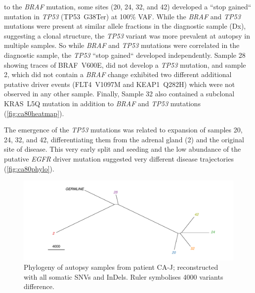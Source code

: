  to the \textit{BRAF} mutation, some sites (20, 24, 32, and 42) developed a ``stop gained`` mutation in \textit{TP53} (TP53~G38Ter) at 100\% VAF. While  the \textit{BRAF} and \textit{TP53} mutations were present at similar allele fractions in the diagnostic sample (Dx), suggesting a clonal structure, the \textit{TP53} variant was more prevalent at autopsy in multiple samples. So while \textit{BRAF} and \textit{TP53} mutations were correlated in the diagnostic sample, the \textit{TP53} ``stop gained`` developed independently.
Sample 28  showing traces of BRAF~V600E, did not develop a \textit{TP53} mutation, and sample 2, which did not contain a \textit{BRAF} change exhibited two different additional putative driver events (FLT4~V1097M and KEAP1~Q282H) which were not observed in any other sample. 
Finally, Sample 32 also contained a subclonal KRAS~L5Q mutation in addition to  \textit{BRAF} and \textit{TP53} mutations (\autoref{fig:ca80heatmap}). 

The emergence of the \textit{TP53} mutations was related to  expansion of samples 20, 24, 32, and 42, differentiating them from the adrenal gland (2) and the original site of  disease. This very early split and seeding and the low abundance of the putative \textit{EGFR} driver mutation suggested very different disease trajectories (\autoref{fig:ca80phylo}). 

\begin{figure}[htp]
	\centering
	\includegraphics[width=.99\linewidth]{Figures/CASCADE/CA80/CA80phylo.pdf}
	\caption[Phylogeny of autopsy samples from patient CA-J]{Phylogeny of autopsy samples from patient CA-J; reconstructed with all somatic SNVs and InDels. Ruler symbolises 4000 variants difference.} \label{fig:ca80phylo}
\end{figure}



